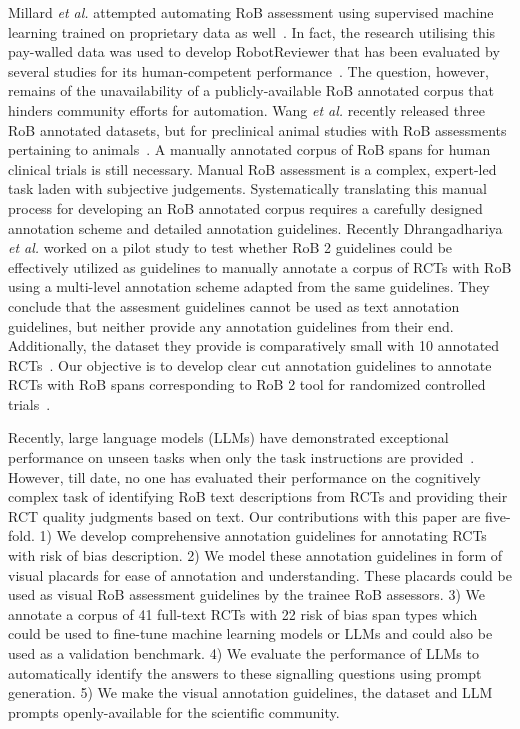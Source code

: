 \documentclass[sn-mathphys,Numbered]{sn-jnl}%
\theoremstyle{thmstyleone}%
\theoremstyle{thmstyletwo}%
\theoremstyle{thmstylethree}%
\begin{document}
Millard \textit{et al.} attempted automating RoB assessment using supervised machine learning trained on proprietary data as well~\cite{millard2016machine}.
In fact, the research utilising this pay-walled data was used to develop RobotReviewer that has been evaluated by several studies for its human-competent performance~\cite{marshall2016robotreviewer,soboczenski2019machine,vinkers2021methodological,jardim2022automating,hirt2021agreement}.
The question, however, remains of the unavailability of a publicly-available RoB annotated corpus that hinders community efforts for automation. 
Wang \textit{et al.} recently released three RoB annotated datasets, but for preclinical animal studies with RoB assessments pertaining to animals~\cite{wang2022risk}.
A manually annotated corpus of RoB spans for human clinical trials is still necessary.
Manual RoB assessment is a complex, expert-led task laden with subjective judgements.
Systematically translating this manual process for developing an RoB annotated corpus requires a carefully designed annotation scheme and detailed annotation guidelines.
Recently Dhrangadhariya \textit{et al.} worked on a pilot study to test whether RoB 2 guidelines could be effectively utilized as guidelines to manually annotate a corpus of RCTs with RoB using a multi-level annotation scheme adapted from the same guidelines.
They conclude that the assesment guidelines cannot be used as text annotation guidelines, but neither provide any annotation guidelines from their end.
Additionally, the dataset they provide is comparatively small with 10 annotated RCTs~\cite{dhrangadhariya2023first}.
Our objective is to develop clear cut annotation guidelines to annotate RCTs with RoB spans corresponding to RoB 2 tool for randomized controlled trials~\cite{sterne2019rob}.



Recently, large language models (LLMs) have demonstrated exceptional performance on unseen tasks when only the task instructions are provided~\cite{chang2023survey}.
However, till date, no one has evaluated their performance on the cognitively complex task of identifying RoB text descriptions from RCTs and providing their RCT quality judgments based on text.
Our contributions with this paper are five-fold. 
1) We develop comprehensive annotation guidelines for annotating RCTs with risk of bias description.
2) We model these annotation guidelines in form of visual placards for ease of annotation and understanding. These placards could be used as visual RoB assessment guidelines by the trainee RoB assessors.
3) We annotate a corpus of 41 full-text RCTs with 22 risk of bias span types which could be used to fine-tune machine learning models or LLMs and could also be used as a validation benchmark.
4) We evaluate the performance of LLMs to automatically identify the answers to these signalling questions using prompt generation.
5) We make the visual annotation guidelines, the dataset and LLM prompts openly-available for the scientific community.
%
%
%
\end{document}
